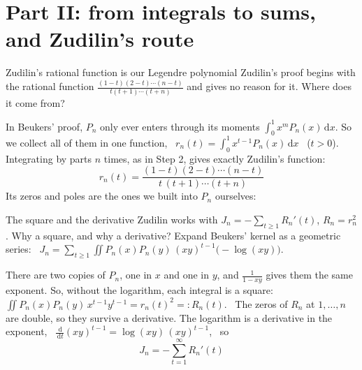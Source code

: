 \documentclass[aspectratio=169,11pt]{beamer}
\newcommand{\dd}{\,\mathrm{d}}
\begin{document}
\section{Part II: from integrals to sums, and Zudilin's route}

\begin{frame}{Zudilin's rational function is our Legendre polynomial}
  Zudilin's proof begins with the rational function
  $\frac{(1-t)(2-t)\cdots(n-t)}{t(t+1)\cdots(t+n)}$ and gives no reason for it. Where does it come from?

  In Beukers' proof, $P_n$ only ever enters through its moments $\int_0^1x^mP_n(x)\dd x$. So we
  collect all of them in one function, \ $r_n(t)=\int_0^1x^{t-1}P_n(x)\dd x$ \ ($t>0$).
  \pause
  Integrating by parts $n$ times, as in Step 2, gives exactly Zudilin's function:
  \[
    \boxed{\;r_n(t)=\frac{(1-t)(2-t)\cdots(n-t)}{t\,(t+1)\cdots(t+n)}\;}
  \]
  \pause
  Its zeros and poles are the ones we built into $P_n$ ourselves:
  \centering
\end{frame}

\begin{frame}{The square and the derivative}
  Zudilin works with $J_n=-\sum_{t\ge1}R_n'(t)$, $R_n=r_n^2$. Why a square, and why a derivative?
  Expand Beukers' kernel as a geometric series:
  \ $J_n=\sum_{t\ge1}\iint P_n(x)P_n(y)\,(xy)^{t-1}\bigl(-\log(xy)\bigr)$.

  \pause
  There are two copies of $P_n$, one in $x$ and one in $y$, and $\frac1{1-xy}$ gives them the same
  exponent. So, without the logarithm, each integral is a square:
  \ $\iint P_n(x)P_n(y)\,x^{t-1}y^{t-1}=r_n(t)^2=:R_n(t)$. \ The zeros of $R_n$ at $1,\dots,n$ are double, so they survive a derivative.
  \pause
  The logarithm is a derivative in the exponent, \ $\frac{\dd}{\dd t}(xy)^{t-1}=\log(xy)\,(xy)^{t-1}$, \ so
  \[
    \boxed{\;J_n=-\sum_{t=1}^\infty R_n'(t)\;}
  \]
\end{frame}
\end{document}
